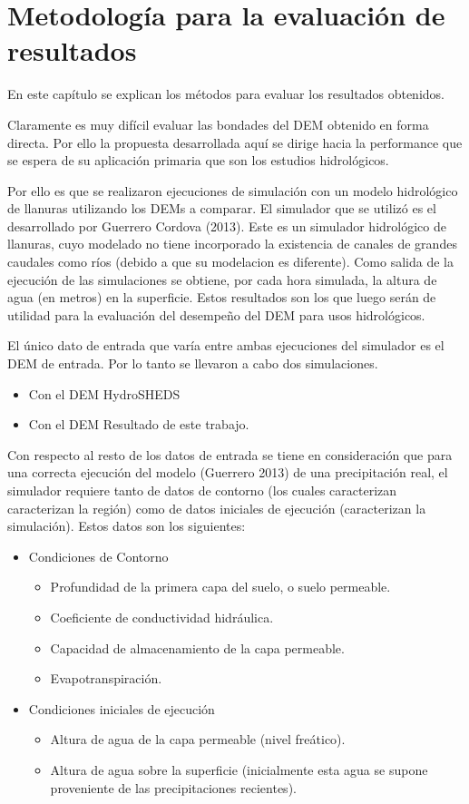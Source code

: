 \documentclass[10pt,a4paper, twoside]{report}
\begin{document}
\chapter{Metodología para la evaluación de resultados}

En este capítulo se explican los métodos para evaluar los resultados obtenidos.

Claramente es muy difícil evaluar las bondades del DEM obtenido en forma directa. Por ello la propuesta desarrollada aquí se dirige hacia la performance que se espera de su aplicación primaria que son los estudios hidrológicos.

Por ello es que se realizaron ejecuciones de simulación con un modelo hidrológico de llanuras utilizando los DEMs a comparar. El simulador que se utilizó es el desarrollado por Guerrero Cordova (2013). Este es un simulador hidrológico de llanuras, cuyo modelado no tiene incorporado la existencia de canales de grandes caudales como ríos (debido a que su modelacion es diferente). Como salida de la ejecución de las simulaciones se obtiene, por cada hora simulada, la altura de agua (en metros) en la superficie. Estos resultados son los que luego serán de utilidad para la evaluación del desempeño del DEM para usos hidrológicos.


El único dato de entrada que varía entre ambas ejecuciones del simulador es el DEM de entrada. Por lo tanto se llevaron a cabo dos simulaciones.

\begin{itemize}
	\item Con el DEM HydroSHEDS
	\item Con el DEM Resultado de este trabajo.
\end{itemize}

Con respecto al resto de los datos de entrada se tiene en consideración que para una correcta ejecución del modelo (Guerrero 2013) de una precipitación real, el simulador requiere tanto de datos de contorno (los cuales caracterizan caracterizan la región) como de datos iniciales de ejecución (caracterizan la simulación). Estos datos son los siguientes:

\begin{itemize}
	\item Condiciones de Contorno
		\begin{itemize}
			\item Profundidad de la primera capa del suelo, o suelo permeable.
			\item Coeficiente de conductividad hidráulica.
			\item Capacidad de almacenamiento de la capa permeable.
			\item Evapotranspiración.			
		\end{itemize}
	\item Condiciones iniciales de ejecución
		\begin{itemize}
			\item Altura de agua de la capa permeable (nivel freático).
			\item Altura de agua sobre la superficie (inicialmente esta agua se supone proveniente de las precipitaciones recientes).
		\end{itemize}
\end{itemize}
\end{document}
